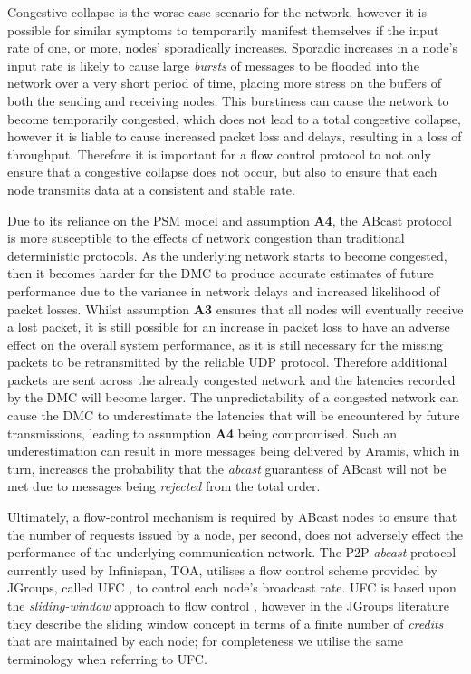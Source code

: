 Congestive collapse is the worse case scenario for the network, however it is possible for similar symptoms to temporarily manifest themselves if the input rate of one, or more, nodes' sporadically increases.  Sporadic increases in a node's input rate is likely to cause large \emph{bursts} of messages to be flooded into the network over a very short period of time, placing more stress on the buffers of both the sending and receiving nodes.  This burstiness can cause the network to become temporarily congested, which does not lead to a total congestive collapse, however it is liable to cause increased packet loss and delays, resulting in a loss of throughput.  Therefore it is important for a flow control protocol to not only ensure that a congestive collapse does not occur, but also to ensure that each node transmits data at a consistent and stable rate.  

Due to its reliance on the PSM model and assumption \textbf{A4}, the \textsf{ABcast} protocol is more susceptible to the effects of network congestion than traditional deterministic protocols.  As the underlying network starts to become congested, then it becomes harder for the DMC to produce accurate estimates of future performance due to the variance in network delays and increased likelihood of packet losses.  Whilst assumption \textbf{A3} ensures that all nodes will eventually receive a lost packet, it is still possible for an increase in packet loss to have an adverse effect on the overall system performance, as it is still necessary for the missing packets to be retransmitted by the reliable UDP protocol.  Therefore additional packets are sent across the already congested network and the latencies recorded by the DMC will become larger.  The unpredictability of a congested network can cause the DMC to underestimate the latencies that will be encountered by future transmissions, leading to assumption \textbf{A4} being compromised.  Such an underestimation can result in more messages being delivered by \textsf{Aramis}, which in turn, increases the probability that the \emph{abcast} guarantess of \textsf{ABcast} will not be met due to messages being \emph{rejected} from the total order.  

Ultimately, a flow-control mechanism is required by \textsf{ABcast} nodes to ensure that the number of requests issued by a node, per second, does not adversely effect the performance of the underlying communication network.  The P2P \emph{abcast} protocol currently used by Infinispan, TOA, utilises a flow control scheme provided by JGroups, called \textsf{UFC} \citep{JGroupsUFC}, to control each node's broadcast rate.  \textsf{UFC} is based upon the \emph{sliding-window} approach to flow control \citep{bertsekas1992DataNetworksFC}, however in the JGroups literature they describe the sliding window concept in terms of a finite number of \emph{credits} that are maintained by each node; for completeness we utilise the same terminology when referring to \textsf{UFC}.  

